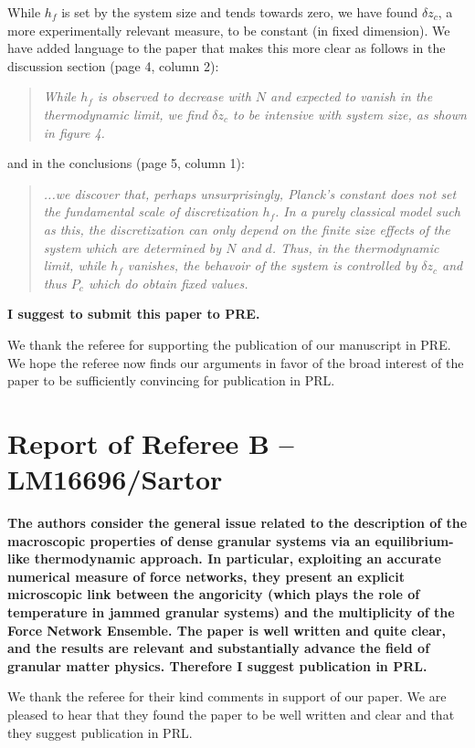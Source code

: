 \documentclass[a4paper,11pt]{article}
\begin{document}
While $h_f$ is set by the system size and tends towards zero, we have found $\delta z_c$, a more experimentally relevant measure, to be constant (in fixed dimension). We have added language to the paper that makes this more clear as follows in the discussion section (page 4, column 2):

\begin{quote}
\textit{While $h_f$ is observed to decrease with $N$ and expected to vanish in the thermodynamic limit, we find $\delta z_c$ to be intensive with system size, as shown in figure 4.}
\end{quote}

and in the conclusions (page 5, column 1):
\begin{quote}
\textit{...we discover that, perhaps unsurprisingly, Planck's constant does not set the fundamental scale of discretization $h_f$. In a purely classical model such as this, the discretization can only depend on the finite size effects of the system which are determined by $N$ and $d$. Thus, in the thermodynamic limit, while $h_f$ vanishes, the behavoir of the system is controlled by $\delta z_c$ and thus $P_c$ which do obtain fixed values.}
\end{quote}
\vskip 0.5cm
\textbf{I suggest to submit this paper to PRE.}
\vskip 0.3cm

We thank the referee for supporting the publication of our manuscript in PRE. We hope the referee now finds our arguments in favor of the broad interest of the paper to be sufficiently convincing for publication in PRL.

\pagebreak
\section*{Report of Referee B -- LM16696/Sartor}

\textbf{The authors consider the general issue related to the description of the macroscopic properties of dense granular systems via an equilibrium-like thermodynamic approach. In particular, exploiting an accurate numerical measure of force networks, they present an explicit microscopic link between the angoricity (which plays the role of temperature in jammed granular systems) and the multiplicity of the Force Network Ensemble. The paper is well written and quite clear, and the results are relevant and substantially advance the field of granular matter physics. Therefore I suggest publication in PRL.}
\vskip 0.3cm

We thank the referee for their kind comments in support of our paper. We are pleased to hear that they found the paper to be well written and clear and that they suggest publication in PRL.
\end{document}
